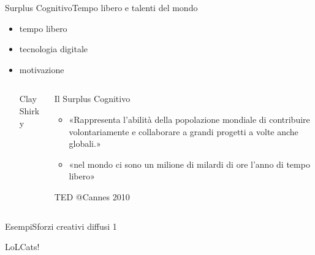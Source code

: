 \documentclass[italian,compress,red]{beamer}
\begin{document}
\begin{frame}{Surplus Cognitivo}{Tempo libero e talenti del mondo}
 \begin{itemize}
  \item tempo libero
  \item tecnologia digitale
  \item motivazione
  
  \begin{columns}[T]
  \begin{column}{.3\textwidth}
    \begin{block}{Clay Shirky}
      \begin{center}
      \end{center}
     \end{block}

  \end{column} 
  \begin{column}{.7\textwidth}
    \begin{exampleblock}{Il Surplus Cognitivo}
    \begin{itemize}
     \item «Rappresenta l'abilità della popolazione mondiale di contribuire volontariamente 
e collaborare a grandi progetti a volte anche globali.»
     \item  «nel mondo ci sono un milione di milardi di ore l'anno di tempo libero»
    \end{itemize}

   
      \vfill
      \begin{tiny} TED @Cannes 2010 \end{tiny}
      
    \end{exampleblock}   
  \end{column}
  \end{columns} 

 \end{itemize}

\end{frame}

\begin{frame}{Esempi}{Sforzi creativi diffusi 1}
\begin{block}{LoLCats!}
\begin{center}
\end{center}
\vfill
\end{block} 
\end{frame}
\end{document}
